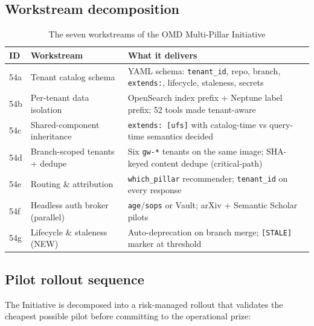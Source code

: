 \documentclass[11pt,letterpaper]{article}
\begin{document}
\subsection{Workstream decomposition}

\begin{table}[H]
\centering
\caption{The seven workstreams of the OMD Multi-Pillar Initiative}
\small
\begin{tabularx}{\textwidth}{llX}
\toprule
\textbf{ID} & \textbf{Workstream} & \textbf{What it delivers} \\
\midrule
54a & Tenant catalog schema & YAML schema: \texttt{tenant\_id}, repo, branch, \texttt{extends:}, lifecycle, staleness, secrets \\
54b & Per-tenant data isolation & OpenSearch index prefix + Neptune label prefix; 52 tools made tenant-aware \\
54c & Shared-component inheritance & \texttt{extends: [ufs]} with catalog-time vs query-time semantics decided \\
54d & Branch-scoped tenants + dedupe & Six \texttt{gw-*} tenants on the same image; SHA-keyed content dedupe (critical-path) \\
54e & Routing \& attribution & \texttt{which\_pillar} recommender; \texttt{tenant\_id} on every response \\
54f & Headless auth broker (parallel) & \texttt{age}/\texttt{sops} or Vault; arXiv + Semantic Scholar pilots \\
54g & Lifecycle \& staleness (NEW) & Auto-deprecation on branch merge; \texttt{[STALE]} marker at threshold \\
\bottomrule
\end{tabularx}
\end{table}

\subsection{Pilot rollout sequence}

The Initiative is decomposed into a risk-managed rollout that
validates the cheapest possible pilot before committing to the
operational prize:
\end{document}
